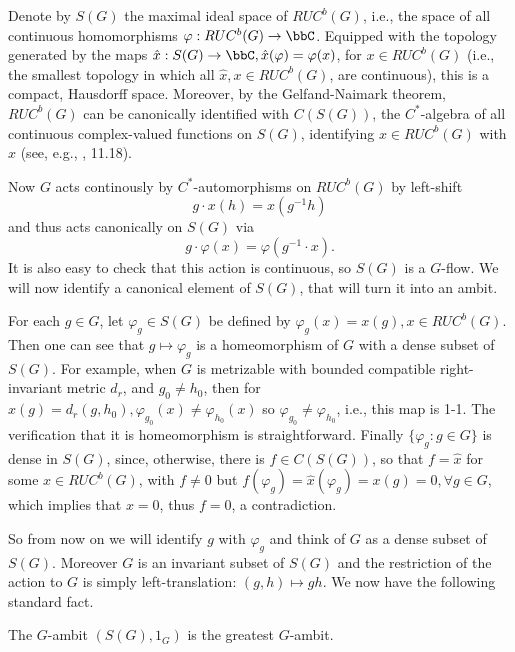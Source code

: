 Denote by $S(G)$ the maximal ideal space of
$RUC^b(G)$, i.e., the space of all continuous homomorphisms $\varphi:RUC^b(G)\rightarrow\bbC$.
Equipped with the topology generated by
the maps $\hat x:S(G)\rightarrow\bbC,\hat x(\varphi )=\varphi (x)$, for
$x\in RUC^b(G)$ (i.e., the smallest topology in which all $\hat x,
    x\in RUC^b(G)$, are continuous), this is a compact, Hausdorff space.
Moreover, by the Gelfand-Naimark theorem, $RUC^b(G)$ can be canonically
identified with $C(S(G))$, the $C^*$-algebra of all continuous
complex-valued functions on $S(G)$, identifying $x\in RUC^b(G)$
with $\hat x$ (see, e.g., \cite{Ru}, 11.18).

Now $G$ acts continously by $C^*$-automorphisms on $RUC^b(G)$ by
left-shift
\[
    g\cdot x(h) =x(g^{-1}h)
\]
and thus acts canonically on $S(G)$ via
\[
    g\cdot\varphi (x)=\varphi (g^{-1}\cdot x).
\]
It is also easy to check that this action is continuous, so $S(G)$ is a
$G$-flow.  We will now identify a canonical element of $S(G)$, that will
turn it into an ambit.

For each $g\in G$, let $\varphi_g\in S(G)$ be defined by $\varphi_g
    (x)=x(g),x\in RUC^b(G)$.  Then one can see that $g\mapsto\varphi_g$
is a homeomorphism of $G$ with a dense subset of $S(G)$.  For example,
when $G$ is metrizable with bounded compatible right-invariant metric
$d_r$, and $g_0\neq h_0$, then for $x(g)=d_r(g,h_0),\varphi_{g_0}(x)\neq
    \varphi_{h_0}(x)$ so $\varphi_{g_0}\neq\varphi_{h_0}$, i.e., this map is
1-1.  The verification that it is homeomorphism is straightforward.
Finally $\{\varphi_g:g\in G\}$ is dense in $S(G)$, since, otherwise,
there is $f\in C(S(G))$, so that $f=\hat x$ for some $x\in RUC^b(G)$,
with $f\neq 0$ but $f(\varphi_g)=\hat x(\varphi_g)=x(g)=0,\forall g\in G$,
which implies that $x=0$, thus $f=0$, a contradiction.

So from now on we will identify $g$ with $\varphi_g$ and think of $G$ as
a dense subset of $S(G)$.  Moreover $G$ is an invariant subset of
$S(G)$ and the restriction of the action to $G$ is simply left-translation:
$(g,h)\mapsto gh$.  We now have the following standard fact.

\begin{theorem}
    \label{1.3}
    The $G$-ambit $(S(G), 1_G)$ is the
    greatest $G$-ambit.
\end{theorem}

